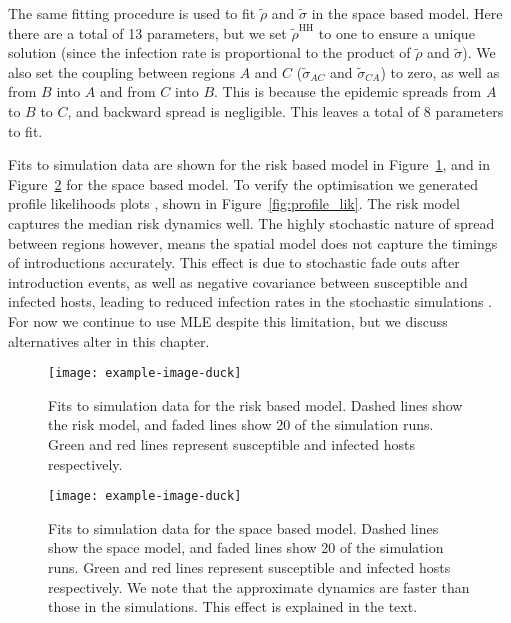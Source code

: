 The same fitting procedure is used to fit $\tilde{\rho}$ and $\tilde{\sigma}$ in the space based model. Here there are a total of 13 parameters, but we set $\tilde{\rho}^\mathrm{HH}$ to one to ensure a unique solution (since the infection rate is proportional to the product of $\tilde{\rho}$ and $\tilde{\sigma}$). We also set the coupling between regions $A$ and $C$ ($\tilde{\sigma}_{AC}$ and $\tilde{\sigma}_{CA}$) to zero, as well as from $B$ into $A$ and from $C$ into $B$. This is because the epidemic spreads from $A$ to $B$ to $C$, and backward spread is negligible. This leaves a total of 8 parameters to fit.

Fits to simulation data are shown for the risk based model in Figure~\ref{fig:risk_fit}, and in Figure~\ref{fig:space_fit} for the space based model. To verify the optimisation we generated profile likelihoods plots \citep{bolker_ecological_2008}, shown in Figure~\ref{fig:profile_lik}. The risk model captures the median risk dynamics well. The highly stochastic nature of spread between regions however, means the spatial model does not capture the timings of introductions accurately. This effect is due to stochastic fade outs after introduction events, as well as negative covariance between susceptible and infected hosts, leading to reduced infection rates in the stochastic simulations \cite[pp.~227--229 and pp.~238--240]{keeling_modeling_2008}. For now we continue to use MLE despite this limitation, but we discuss alternatives alter in this chapter.

\begin{figure}[h]
    \begin{center}
        \texttt{[image: example-image-duck]}
        \caption{Fits to simulation data for the risk based model. Dashed lines show the risk model, and faded lines show 20 of the simulation runs. Green and red lines represent susceptible and infected hosts respectively.}
        \label{fig:risk_fit}
    \end{center}
\end{figure}

\begin{figure}[h]
    \begin{center}
        \texttt{[image: example-image-duck]}
        \caption{Fits to simulation data for the space based model. Dashed lines show the space model, and faded lines show 20 of the simulation runs. Green and red lines represent susceptible and infected hosts respectively. We note that the approximate dynamics are faster than those in the simulations. This effect is explained in the text.}
        \label{fig:space_fit}
    \end{center}
\end{figure}

